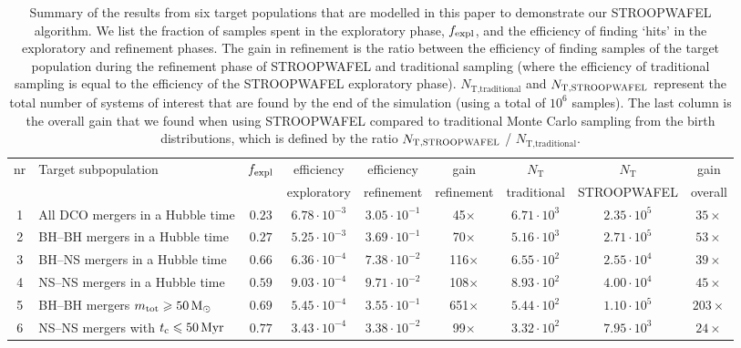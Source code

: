 \documentclass[a4paper,fleqn,usenatbib,useAMS,usedcolumn]{mnras}
\newcommand{\AISs}{\textsc{STROOPWAFEL}}
\newcommand\fexplOne{$0.23$}
\newcommand\EffExplOne{$6.78  \cdot 10^{-3}$}
\newcommand\EffRefOne{$3.05   \cdot 10^{-1}$}
\newcommand\NxMCOne{$6.71  \cdot 10^{3}$}
\newcommand\NxAISOne{$2.35 \cdot 10^{5}$}
\newcommand\gainOne{$35 \times$}
\newcommand\fexplTwo{$0.27$}
\newcommand\EffExplTwo{$5.25 \cdot  10^{-3}$}
\newcommand\EffRefTwo{$3.69 \cdot  10^{-1}$}
\newcommand\NxMCTwo{$5.16  \cdot  10^3$}
\newcommand\NxAISTwo{$2.71 \cdot  10^5 $}
\newcommand\gainTwo{$53 \times$}
\newcommand\fexplThree{$0.66$}
\newcommand\EffExplThree{$6.36 \cdot  10^{-4}$}
\newcommand\EffRefThree{$7.38 \cdot 10^{-2}$}
\newcommand\NxMCThree{$6.55 \cdot  10^{2}$}
\newcommand\NxAISThree{$2.55 \cdot  10^{4}$}
\newcommand\gainThree{$39 \times$}
\newcommand\fexplFour{$0.59$}
\newcommand\EffExplFour{$9.03 \cdot  10^{-4}$}
\newcommand\EffRefFour{$9.71 \cdot 10^{-2}$}
\newcommand\NxMCFour{$8.93 \cdot  10^{2}$}
\newcommand\NxAISFour{$4.00 \cdot  10^{4}$}
\newcommand\gainFour{$45 \times$}
\newcommand\fexplFive{$0.69 $}
\newcommand\EffExplFive{$5.45 \cdot  10^{-4}$}
\newcommand\EffRefFive{$3.55 \cdot  10^{-1}$}
\newcommand\NxMCFive{$5.44 \cdot  10^{2}$}
\newcommand\NxAISFive{$1.10 \cdot  10^{5}$}
\newcommand\gainFive{$203 \times$}
\newcommand\fexplSix{$0.77 $}
\newcommand\EffExplSix{$3.43 \cdot  10^{-4}$}
\newcommand\EffRefSix{$3.38 \cdot  10^{-2}$}
\newcommand\NxMCSix{$3.32 \cdot  10^{2}$}
\newcommand\NxAISSix{$7.95 \cdot  10^{3}$}
\newcommand\gainSix{$24 \times$}
\begin{document}
\begin{table} %
\centering
\begin{tabular}{|c|l|c|c|c|c|c|c|c|}
\hline
nr & Target subpopulation     		    &   $f_{\rm{expl}}$  &   {efficiency}    		&  { efficiency}  & gain & $N_{\text{T}}$ & $ N_{\text{T}}$ &   gain  	\\
&	       &			                        & 	exploratory  		          &	  refinement     & refinement         & traditional  & \AISs{} & 	 overall\\ \hline
1 & All DCO mergers in a Hubble time   &  \fexplOne  & \EffExplOne  & \EffRefOne  & 45$\times$ & \NxMCOne   & \NxAISOne & \gainOne  \\
2 & BH--BH mergers in a Hubble time    &  \fexplTwo  & \EffExplTwo  & \EffRefTwo & 70$\times$ & \NxMCTwo   & \NxAISTwo & \gainTwo  \\ %
3 & BH--NS mergers in a Hubble time     &  \fexplThree  & \EffExplThree & \EffRefThree & 116$\times$ & \NxMCThree   & \NxAISThree & \gainThree  \\ %
4 & NS--NS mergers in a Hubble time     &  \fexplFour  & \EffExplFour  & \EffRefFour & 108$\times$ & \NxMCFour   & \NxAISFour & \gainFour  \\ \hline
5 & BH--BH mergers $m_{\rm{tot}} \geq 50 \, \rm{M}_{\odot}$      &  \fexplFive  & \EffExplFive &  \EffRefFive & 651$\times$ & \NxMCFive   & \NxAISFive & \gainFive  \\
6 & NS--NS mergers with $t_{\rm{c}} \leq 50 \, \rm{Myr}$   &  \fexplSix  & \EffExplSix  & \EffRefSix & 99$\times$ & \NxMCSix   & \NxAISSix & \gainSix  \\ \hline
\end{tabular}
\caption{Summary of the results from six  target populations that are modelled in this paper to demonstrate our \AISs{} algorithm.  We list the fraction of samples spent in the exploratory phase, $f_{\rm{expl}}$, and the efficiency of finding `hits' in the exploratory and refinement phases. The gain in refinement is the ratio between the efficiency of finding samples of the target population during the refinement phase  of  \AISs{} and traditional sampling (where the efficiency of traditional sampling is equal to the efficiency of the \AISs{} exploratory phase).   $N_{\text{T,traditional}}$ and  $ N_{\text{T,\AISs{}}}$ represent the total number of systems of interest that are found by the end of the simulation (using a total of $10^6$ samples). The last column is the overall gain that we found when using \AISs{} compared to traditional Monte Carlo sampling from the birth distributions, which is defined by the ratio   $ N_{\text{T,\AISs{}}}$ / $N_{\text{T,traditional}}$.  \href{https://doi.org/10.5281/zenodo.3387651}{\color{linkcolor}\faBook}}
\label{tab:comparison2}
\end{table} 
\end{document}
